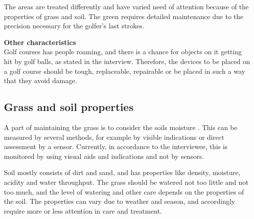 The areas are treated differently and have varied need of attention because of the properties of grass and soil. The green requires detailed maintenance due to the precision necessary for the golfer's last strokes.

\textbf{Other characteristics}\\
Golf courses has people roaming, and there is a chance for objects on it getting hit by golf balls, as stated in the interview. Therefore, the devices to be placed on a golf course should be tough, replaceable, repairable or be placed in such a way that they avoid damage.

\subsection{Grass and soil properties}
A part of maintaining the grass is to consider the soils moisture \cite{golfGrass}. This can be measured by several methods, for example by visible indications or direct assessment by a sensor. Currently, in accordance to the interviewee, this is monitored by using visual aids and indications and not by sensors. 

Soil mostly consists of dirt and sand\cite{soilinfo}, and has properties like density, moisture, acidity and water throughput. The grass should be watered not too little and not too much, and the level of watering and other care depends on the properties of the soil. The properties can vary due to weather and season, and accordingly require more or less attention in care and treatment. 
